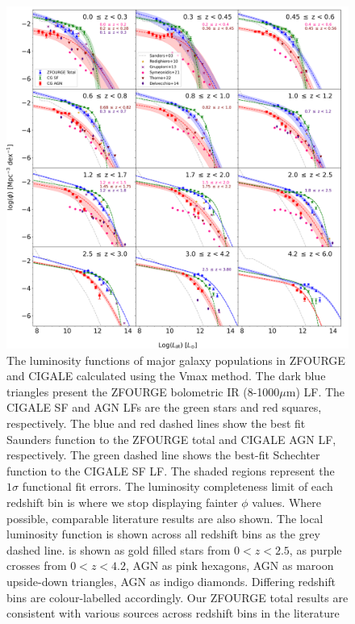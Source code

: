 \begin{figure}
    \centering
    \includegraphics[width=\textwidth]{Figures/LF.png}
    \caption{The luminosity functions of major galaxy populations in ZFOURGE and CIGALE calculated using the Vmax method. The dark blue triangles present the ZFOURGE bolometric IR (8-1000$\mu$m) LF. The CIGALE SF and AGN LFs are the green stars and red squares, respectively. The blue and red dashed lines show the best fit Saunders function \citep{saunders_60-mum_1990} to the ZFOURGE total and CIGALE AGN LF, respectively. The green dashed line shows the best-fit Schechter function \citep{schechter_analytic_1976} to the CIGALE SF LF. The shaded regions represent the $1\sigma$ functional fit errors. The luminosity completeness limit of each redshift bin is where we stop displaying fainter $\phi$ values. Where possible, comparable literature results are also shown. The local \cite{sanders_iras_2003} luminosity function is shown across all redshift bins as the grey dashed line. \cite{rodighiero_mid-_2010} is shown as gold filled stars from $0 < z < 2.5$, \cite{gruppioni_herschel_2013} as purple crosses from $0 < z < 4.2$, \cite{symeonidis_agn_2021} AGN as pink hexagons, \cite{thorne_deep_2022} AGN as maroon upside-down triangles, \cite{delvecchio_tracing_2014} AGN as indigo diamonds. Differing redshift bins are colour-labelled accordingly. Our ZFOURGE total results are consistent with various sources across redshift bins in the literature \citep{caputi_infrared_2007, huang_local_2007, fu_decomposing_2010}}
    \label{Fig: Bolometric IR LF}
\end{figure}

